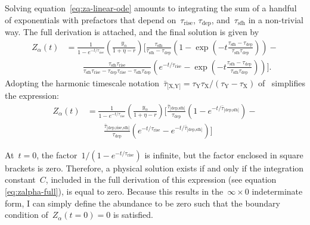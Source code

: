 \documentclass[12pt]{article}
\newcommand{\timescale}[1]{\ensuremath{\tau_\text{#1}}}
\newcommand{\harmonic}[2]{\ensuremath{\bar{\tau}_\text{[#1,#2]}}}
\newcommand{\hharmonic}[3]{\ensuremath{\bar{\tau}_\text{[#1,#2,#3]}}}
\begin{document}
Solving equation~\ref{eq:za-linear-ode} amounts to integrating the sum of a
handful of exponentials with prefactors that depend on~\timescale{rise},
\timescale{dep}, and~\timescale{sfh} in a non-trivial way.
The full derivation is attached, and the final solution is given by
\begin{equation}
\begin{split}
Z_\alpha(t) &= \frac{1}{1 - e^{-t / \timescale{rise}}}
\left(\frac{y_\alpha}{1 + \eta - r}\right)
\bigg[\frac{
	\timescale{sfh}
}{
	\timescale{sfh} - \timescale{dep}
} \left(
1 - \exp\left(-t\frac{
	\timescale{sfh} - \timescale{dep}
}{
	\timescale{sfh}\timescale{dep}
}\right)
\right) -
\\
&\qquad \frac{
	\timescale{sfh}\timescale{rise}
}{
	\timescale{sfh}\timescale{rise} - \timescale{dep}\timescale{rise} -
	\timescale{sfh}\timescale{dep}
} \left(e^{-t / \timescale{rise}} -
\exp\left(-t
\frac{
	\timescale{sfh} - \timescale{dep}
}{
	\timescale{sfh}\timescale{dep}
}
\right)
\right)\bigg].
\end{split}
\label{eq:zalpha}
\end{equation}
Adopting the harmonic timescale notation~$\harmonic{X}{Y} = \timescale{Y}
\timescale{X} / (\timescale{Y} - \timescale{X})$ of~\citet*{Weinberg2017}
simplifies the expression:
\begin{equation}
\begin{split}
Z_\alpha(t) &= \frac{1}{1 - e^{-t / \timescale{rise}}} \left( \frac{
	y_\alpha
}{
	1 + \eta - r
}\right) \bigg[
\frac{\harmonic{dep}{sfh}}{\timescale{dep}}
\left(1 - e^{-t / \harmonic{dep}{sfh}}\right) -
\\
&\qquad \frac{\hharmonic{dep}{rise}{sfh}}{\timescale{dep}}
\left(e^{-t / \timescale{rise}} - e^{-t / \harmonic{dep}{sfh}}\right)
\bigg]
\end{split}
\end{equation}
\par
At~$t = 0$, the factor~$1 / (1 - e^{-t / \timescale{rise}})$ is infinite,
but the factor enclosed in square brackets is zero.
Therefore, a physical solution exists if and only if the integration
constant~$C$, included in the full derivation of this expression (see equation
\ref{eq:zalpha-full}), is equal to zero.
Because this results in the~$\infty \times 0$ indeterminate form, I can simply
define the abundance to be zero such that the boundary condition
of~$Z_\alpha(t = 0) = 0$ is satisfied.
\end{document}
